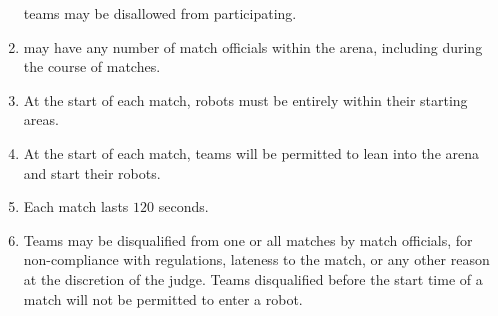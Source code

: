 \begin{enumerate}
        teams may be disallowed from participating.
  \item \org may have any number of match officials within the arena, including
        during the course of matches.
  \item At the start of each match, robots must be entirely within their
        starting areas.
  \item At the start of each match, teams will be permitted to lean into the
        arena and start their robots.
  \item Each match lasts $120$ seconds.
  \item Teams may be disqualified from one or all matches by match officials,
        for non-compliance with regulations, lateness to the match, or any other
        reason at the discretion of the judge. Teams disqualified before the
        start time of a match will not be permitted to enter a robot.
\end{enumerate}
